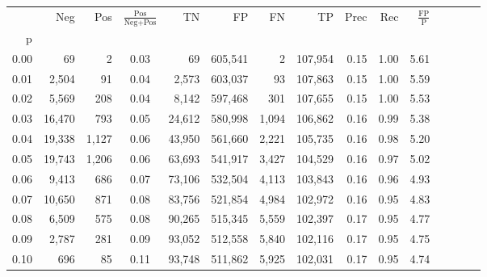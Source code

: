 \begin{tabular}{rrrcrrrrrrrrrrr}
\toprule
{} &     Neg &    Pos & $\frac{\text{Pos}}{\text{Neg}+\text{Pos}}$ &       TN &       FP &       FN &       TP &  Prec &   Rec & $\frac{\text{FP}}{\text{P}}$ \\
p    &         &        &                                            &          &          &          &          &       &       &                              \\
\midrule
0.00 &      69 &      2 &                                       0.03 &       69 &  605,541 &        2 &  107,954 &  0.15 &  1.00 &                         5.61 \\
0.01 &   2,504 &     91 &                                       0.04 &    2,573 &  603,037 &       93 &  107,863 &  0.15 &  1.00 &                         5.59 \\
0.02 &   5,569 &    208 &                                       0.04 &    8,142 &  597,468 &      301 &  107,655 &  0.15 &  1.00 &                         5.53 \\
0.03 &  16,470 &    793 &                                       0.05 &   24,612 &  580,998 &    1,094 &  106,862 &  0.16 &  0.99 &                         5.38 \\
0.04 &  19,338 &  1,127 &                                       0.06 &   43,950 &  561,660 &    2,221 &  105,735 &  0.16 &  0.98 &                         5.20 \\
0.05 &  19,743 &  1,206 &                                       0.06 &   63,693 &  541,917 &    3,427 &  104,529 &  0.16 &  0.97 &                         5.02 \\
0.06 &   9,413 &    686 &                                       0.07 &   73,106 &  532,504 &    4,113 &  103,843 &  0.16 &  0.96 &                         4.93 \\
0.07 &  10,650 &    871 &                                       0.08 &   83,756 &  521,854 &    4,984 &  102,972 &  0.16 &  0.95 &                         4.83 \\
0.08 &   6,509 &    575 &                                       0.08 &   90,265 &  515,345 &    5,559 &  102,397 &  0.17 &  0.95 &                         4.77 \\
0.09 &   2,787 &    281 &                                       0.09 &   93,052 &  512,558 &    5,840 &  102,116 &  0.17 &  0.95 &                         4.75 \\
0.10 &     696 &     85 &                                       0.11 &   93,748 &  511,862 &    5,925 &  102,031 &  0.17 &  0.95 &                         4.74 \\

\end{tabular}
